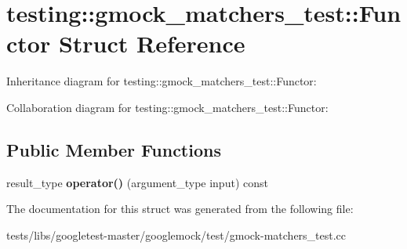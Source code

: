 \hypertarget{structtesting_1_1gmock__matchers__test_1_1Functor}{}\section{testing\+:\+:gmock\+\_\+matchers\+\_\+test\+:\+:Functor Struct Reference}
\label{structtesting_1_1gmock__matchers__test_1_1Functor}


Inheritance diagram for testing\+:\+:gmock\+\_\+matchers\+\_\+test\+:\+:Functor\+:


Collaboration diagram for testing\+:\+:gmock\+\_\+matchers\+\_\+test\+:\+:Functor\+:
\subsection*{Public Member Functions}
\begin{DoxyCompactItemize}
\item 
\mbox{\label{structtesting_1_1gmock__matchers__test_1_1Functor_a5beee965d62e6bc1d591163659bad913}} 
result\+\_\+type {\bfseries operator()} (argument\+\_\+type input) const
\end{DoxyCompactItemize}


The documentation for this struct was generated from the following file\+:\begin{DoxyCompactItemize}
\item 
tests/libs/googletest-\/master/googlemock/test/gmock-\/matchers\+\_\+test.\+cc\end{DoxyCompactItemize}
